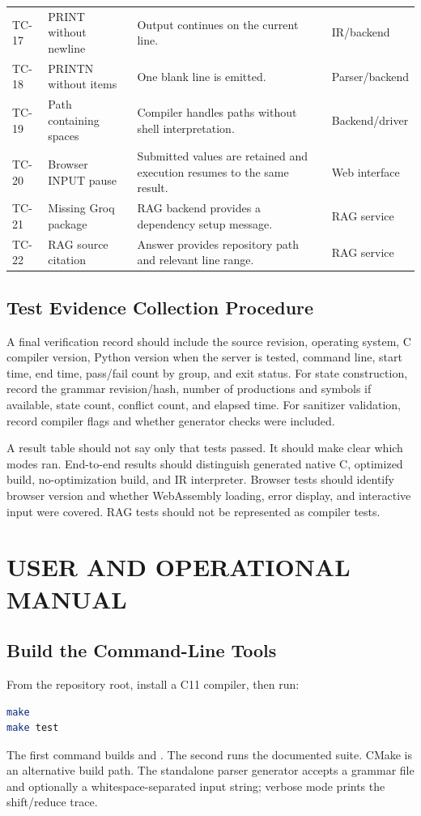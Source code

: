 \documentclass[12pt,a4paper,oneside]{report}
\newcommand{\code}[1]{\texttt{\detokenize{#1}}}
\begin{document}
\begin{longtable}{p{1.2cm}p{}p{}p{}}
TC-17 & PRINT without newline & Output continues on the current line. & IR/backend\\
TC-18 & PRINTN without items & One blank line is emitted. & Parser/backend\\
TC-19 & Path containing spaces & Compiler handles paths without shell interpretation. & Backend/driver\\
TC-20 & Browser INPUT pause & Submitted values are retained and execution resumes to the same result. & Web interface\\
TC-21 & Missing Groq package & RAG backend provides a dependency setup message. & RAG service\\
TC-22 & RAG source citation & Answer provides repository path and relevant line range. & RAG service\\
\bottomrule
\end{longtable}

\section{Test Evidence Collection Procedure}
A final verification record should include the source revision, operating system, C compiler version, Python version when the server is tested, command line, start time, end time, pass/fail count by group, and exit status. For state construction, record the grammar revision/hash, number of productions and symbols if available, state count, conflict count, and elapsed time. For sanitizer validation, record compiler flags and whether generator checks were included.

A result table should not say only that tests passed. It should make clear which modes ran. End-to-end results should distinguish generated native C, optimized build, no-optimization build, and IR interpreter. Browser tests should identify browser version and whether WebAssembly loading, error display, and interactive input were covered. RAG tests should not be represented as compiler tests.

\chapter{USER AND OPERATIONAL MANUAL}
\section{Build the Command-Line Tools}
From the repository root, install a C11 compiler, then run:
\begin{lstlisting}[language=bash]
make
make test
\end{lstlisting}
The first command builds \code{leoc} and \code{clr_parser}. The second runs the documented suite. CMake is an alternative build path. The standalone parser generator accepts a grammar file and optionally a whitespace-separated input string; verbose mode prints the shift/reduce trace.
\end{document}
